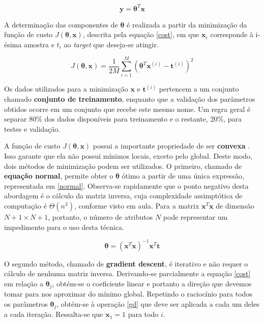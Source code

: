 \documentclass[10pt,twocolumn,letterpaper]{article}
\begin{document}
\begin{equation}
\label {lr}
\bm{y} = \bm{\theta}^T\bm{x}
\end{equation}

A determinação das componentes de \(\bm{\theta}\) é realizada a partir da minimização da função de custo \(J(\bm{\theta}, \bm{x})\), descrita pela equação \ref{cost}, em que \(\bm{x}_ i\) corresponde à i-ésima amostra e \(t_ i\) ao \textit{target} que deseja-se atingir.

\begin{equation}
\label {cost}
J(\bm{\theta}, \bm{x}) = \frac{1}{2M} \displaystyle\sum_{i=1}^{M} \left(\bm{\theta}^T\bm{x}^{(i)} - \bm{t}^{(i)}\right)^2
\end{equation}

Os dados utilizados para a minimização \(\bm{x}\) e \(\bm{t}^{(i)}\) pertencem a um conjunto chamado \textbf{conjunto de treinamento}, enquanto que a validação dos parâmetros obtidos ocorre em um conjunto que recebe este mesmo nome. Um regra geral é separar 80\% dos dados disponíveis para treinamento e o restante, 20\%, para testes e validação.

A função de custo \(J(\bm{\theta}, \bm{x})\) possui a importante propriedade de ser \textbf{convexa} \cite{Bishop:2006:PRM:1162264}. Isso garante que ela não possui mínimos locais, exceto pelo global. Deste modo, dois métodos de minimização podem ser utilizados. O primeiro, chamado de \textbf{equação normal}, permite obter o \(\bm{\theta}\) ótimo a partir de uma única expressão, representada em \ref{normal}. Observa-se rapidamente que o ponto negativo desta abordagem é o cálculo da matriz inversa, cuja complexidade assimptótica de computação é \(\Theta(n^3)\), conforme visto em aula. Para a matrix \(\bm{x}^T\bm{x}\) de dimensão \(N+1 \times N+1\), portanto, o número de atributos \(N\) pode representar um impedimento para o uso desta técnica.

\begin{equation}
\label {normal}
\bm{\theta} = \left(\bm{x}^T\bm{x}\right)^{-1} \bm{x}^T \bm{t}
\end{equation}

O segundo método, chamado de \textbf{gradient descent}, é iterativo e não requer o cálculo de nenhuma matriz inversa. Derivando-se parcialmente a equação \ref{cost} em relação a \(\bm{\theta}_j\), obtém-se o coeficiente linear e portanto a direção que devemos tomar para nos aproximar do mínimo global. Repetindo o raciocínio para todos os parâmetros \(\bm{\theta}_j\), obtém-se à operação \ref{gd} que deve ser aplicada a cada um deles a cada iteração. Ressalta-se que \(\bm{x}_1 = 1\) para todo \(i\).
\end{document}
